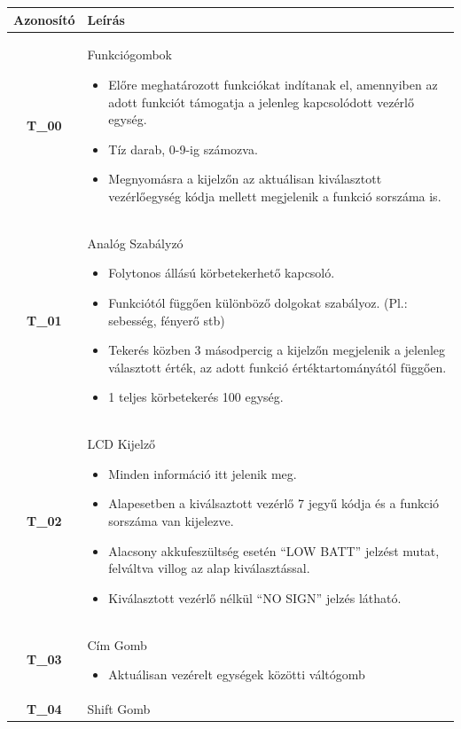 \documentclass{article}
\begin{document}
\begingroup
\centering
\begin{longtable}{|c|p{14cm}|}
\hline
\textbf{Azonosító} & \textbf{Leírás}        \\ 
\hline
       \textbf{T\_00}  & Funkciógombok
       \begin{itemize}
        \item Előre meghatározott funkciókat indítanak el, amennyiben az adott funkciót támogatja a jelenleg kapcsolódott vezérlő egység.
        \item Tíz darab, 0-9-ig számozva.
        \item Megnyomásra a kijelzőn az aktuálisan kiválasztott vezérlőegység kódja mellett megjelenik a funkció sorszáma is.
        \end{itemize}
       \\\hline
       \textbf{T\_01}  & Analóg Szabályzó 
       \begin{itemize}
        \item Folytonos állású körbetekerhető kapcsoló.
        \item Funkciótól függően különböző dolgokat szabályoz. (Pl.: sebesség, fényerő stb)
        \item Tekerés közben 3 másodpercig a kijelzőn megjelenik a jelenleg választott érték, az adott funkció értéktartományától függően.
        \item 1 teljes körbetekerés 100 egység.
        \end{itemize}
       \\\hline
       \textbf{T\_02}  & LCD Kijelző
       \begin{itemize}
        \item Minden információ itt jelenik meg.
        \item Alapesetben a kiválsaztott vezérlő 7 jegyű kódja és a funkció sorszáma van kijelezve. 
        \item Alacsony akkufeszültség esetén “LOW BATT” jelzést mutat, felváltva villog az alap kiválasztással.
        \item Kiválasztott vezérlő nélkül “NO SIGN” jelzés látható.
        \end{itemize}
       \\\hline
       \textbf{T\_03}  & Cím Gomb 
       \begin{itemize}
        \item Aktuálisan vezérelt egységek közötti váltógomb
        \end{itemize}
       \\\hline
       \textbf{T\_04}  & Shift Gomb 

\end{longtable}
\end{document}

